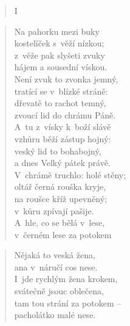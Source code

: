 
\begin{verse}
I~\end{verse}

\begin{verse}
Na pahorku mezi buky \\
kostelíček s~věží nízkou; \\
z~věže pak slyšeti zvuky \\
hájem a sousední vískou. \\
Není zvuk to zvonka jemný, \\
tratící se v~blízké stráně: \\
dřevatě to rachot temný, \\
zvoucí lid do chrámu Páně. \\
A~tu z~vísky k~boží slávě \\
vzhůru běží zástup hojný: \\
veský lid to bohabojný, \\
a dnes Velký pátek právě. \\
V~chrámě truchlo: holé stěny; \\
oltář černá rouška kryje, \\
na roušce kříž upevněný; \\
v~kůru zpívají pašije. \\
A~hle, co se bělá v~lese, \\
v~černém lese za potokem
\end{verse}

\begin{verse}
Nějaká to veská žena, \\
ana v~náručí cos nese. \\
I~jde rychlým žena krokem, \\
svátečně jsouc oblečena, \\
tam tou strání za potokem -- \\
pacholátko malé nese.
\end{verse}

